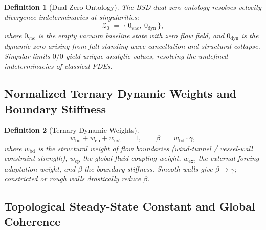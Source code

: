 \documentclass[11pt,a4paper]{article}
\newtheorem{definition}{Definition}
\theoremstyle{remark}
\begin{document}
\begin{definition}[Dual-Zero Ontology]\label{def:dual-zero}
The BSD dual-zero ontology resolves velocity divergence indeterminacies at singularities:
\begin{equation}\label{eq:dual-zero}
\mathcal{Z}_{0} \;=\; \{\,0_{\mathrm{vac}},\ 0_{\mathrm{dyn}}\,\},
\end{equation}
where $0_{\mathrm{vac}}$ is the empty vacuum baseline state with zero flow field, and $0_{\mathrm{dyn}}$ is the dynamic zero arising from full standing-wave cancellation and structural collapse. Singular limits $0/0$ yield unique analytic values, resolving the undefined indeterminacies of classical PDEs.
\end{definition}

\subsection{Normalized Ternary Dynamic Weights and Boundary Stiffness}\label{sec:ternary}

\begin{definition}[Ternary Dynamic Weights]\label{def:ternary}
\begin{equation}\label{eq:ternary}
w_{\mathrm{bd}} + w_{\mathrm{cp}} + w_{\mathrm{ext}} \;=\; 1,
\qquad \beta \;=\; w_{\mathrm{bd}}\cdot\gamma,
\end{equation}
where $w_{\mathrm{bd}}$ is the structural weight of flow boundaries (wind-tunnel / vessel-wall constraint strength), $w_{\mathrm{cp}}$ the global fluid coupling weight, $w_{\mathrm{ext}}$ the external forcing adaptation weight, and $\beta$ the boundary stiffness. Smooth walls give $\beta\to\gamma$; constricted or rough walls drastically reduce $\beta$.
\end{definition}

\subsection{Topological Steady-State Constant and Global Coherence}\label{sec:pi2-gc}
\end{document}
